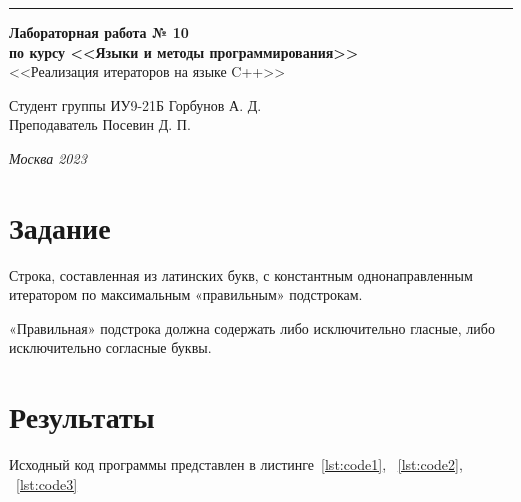 \documentclass[a4paper, 14pt]{extarticle}
\begin{document}
\begin{titlepage}
\vspace*{-16pt}
\hspace{30pt}\rule{0.866\textwidth}{0.4pt}
  
\vspace{11em}

\begin{center}
\Large {\bf Лабораторная работа № 10} \\ 
\large {\bf по курсу <<Языки и методы программирования>>} \\
\large <<Реализация итераторов на языке C++>> 
\end{center}\normalsize

\vspace{8em}


\begin{flushright}
  {Студент группы ИУ9-21Б Горбунов А. Д. \hspace*{15pt}\\ 
  \vspace{2ex}
  Преподаватель Посевин Д. П.\hspace*{15pt}}
\end{flushright}

\bigskip

\vfill
 

\begin{center}
\textsl{Москва 2023}
\end{center}
\end{titlepage}

\renewcommand{\ttdefault}{pcr}

\setlength{\tabcolsep}{3pt}
\newpage
\setcounter{page}{2}

\section{Задание}\label{Sect::task}
    Строка, составленная из латинских букв, с константным однонаправленным итератором по максимальным «правильным» подстрокам.
    
    «Правильная» подстрока должна содержать либо исключительно гласные, либо исключительно согласные буквы.
\section{Результаты}\label{Sect::res}

Исходный код программы представлен в листинге~\ref{lst:code1}, ~\ref{lst:code2}, ~\ref{lst:code3}
\end{document}
